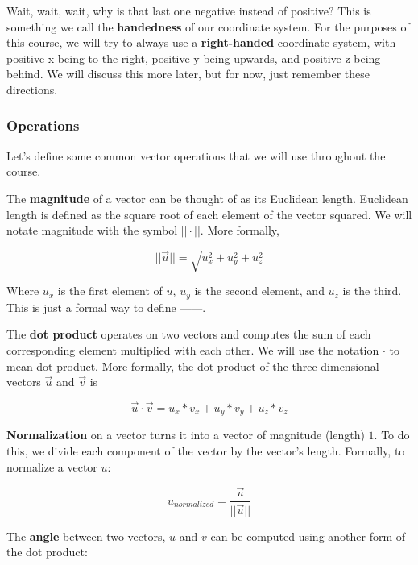 \documentclass[a4paper]{article}
\begin{document}
Wait, wait, wait, why is that last one negative instead of positive? This is something we call the \textbf{handedness} of our coordinate system. For the purposes of this course, we will try to always use a \textbf{right-handed} coordinate system, with positive x being to the right, positive y being upwards, and positive z being behind. We will discuss this more later, but for now, just remember these directions.

\subsubsection{Operations}

Let's define some common vector operations that we will use throughout the course.

The \textbf{magnitude} of a vector can be thought of as its Euclidean length. Euclidean length is defined as the square root of each element of the vector squared. We will notate magnitude with the symbol $||\cdot||$. More formally, 

\begin{equation} \label{eq:mag}
||\vec u|| = \sqrt{u_x^2 + u_y^2 + u_z^2}
\end{equation}

Where $u_x$ is the first element of $u$, $u_y$ is the second element, and $u_z$ is the third. This is just a formal way to define ------.

The \textbf{dot product} operates on two vectors and computes the sum of each corresponding element multiplied with each other. We will use the notation $\cdot$ to mean dot product. More formally, the dot product of the three dimensional vectors $\vec u$ and $\vec v$ is 

\begin{equation} \label{eq:dot1}
\vec u \cdot \vec v = u_x * v_x + u_y * v_y + u_z * v_z
\end{equation}

\textbf{Normalization} on a vector turns it into a vector of magnitude (length) $1$. To do this, we divide each component of the vector by the vector's length. Formally, to normalize a vector $u$:

\begin{equation} \label{eq:mag}
u_{normalized} = \frac{\vec u}{||\vec u||}
\end{equation}

The \textbf{angle} between two vectors, $u$ and $v$ can be computed using another form of the dot product:
\end{document}
